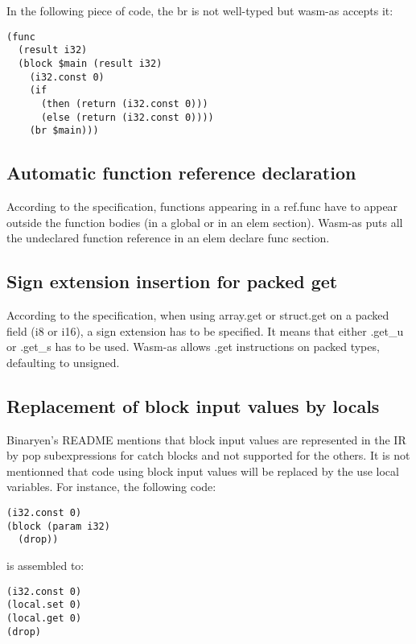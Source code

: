 \documentclass[a4paper,11pt]{article}
\begin{document}
In the following piece of code, the \textsf{br} is not well-typed but wasm-as accepts
it:
\begin{lstlisting}
(func
  (result i32)
  (block $main (result i32)
    (i32.const 0)
    (if
      (then (return (i32.const 0)))
      (else (return (i32.const 0))))
    (br $main)))
\end{lstlisting}
\subsection{Automatic function reference declaration}
According to the specification, functions appearing in a \textsf{ref.func} have to
appear outside the function bodies (in a global or in an elem section). Wasm-as
puts all the undeclared function reference in an \textsf{elem declare func} section.

\subsection{Sign extension insertion for packed get}
According to the specification, when using \textsf{array.get} or
\textsf{struct.get} on a packed field (\textsf{i8} or \textsf{i16}), a sign
extension has to be specified. It means that either \textsf{.get\_u} or
\textsf{.get\_s} has to be used. Wasm-as allows \textsf{.get} instructions on
packed types, defaulting to unsigned.

\subsection{Replacement of block input values by locals}
Binaryen's README mentions that block input values are represented in the IR by
\textsf{pop} subexpressions for \textsf{catch} blocks and not supported for the
others. It is not mentionned that code using block input values will be replaced
by the use local variables. For instance, the following code:
\begin{lstlisting}
(i32.const 0)
(block (param i32)
  (drop))
\end{lstlisting}
is assembled to:
\begin{lstlisting}
(i32.const 0)
(local.set 0)
(local.get 0)
(drop)
\end{lstlisting}
\end{document}
